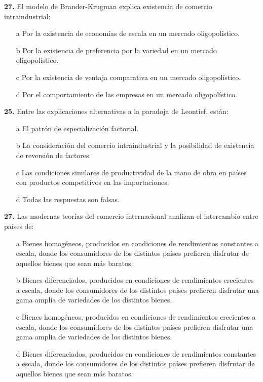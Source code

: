 \documentclass{nuevotema}
\begin{document}
\textbf{27.} El modelo de Brander-Krugman explica existencia de comercio intraindustrial:
\begin{itemize}
	\item[a] Por la existencia de economías de escala en un mercado oligopolístico.
	\item[b] Por la existencia de preferencia por la variedad en un mercado oligopolístico.
	\item[c] Por la existencia de ventaja comparativa en un mercado oligopolístico.
	\item[d] Por el comportamiento de las empresas en un mercado oligopolístico.
\end{itemize}

\textbf{25.} Entre las explicaciones alternativas a la paradoja de Leontief, están:
\begin{itemize}
	\item[a] El patrón de especialización factorial.
	\item[b] La consideración del comercio intraindustrial y la posibilidad de existencia de reversión de factores.
	\item[c] Las condiciones similares de productividad de la mano de obra en países con productos competitivos en las importaciones.
	\item[d] Todas las respuestas son falsas.
\end{itemize}

\textbf{27.} Las modernas teorías del comercio internacional analizan el intercambio entre países de:
\begin{itemize}
	\item[a] Bienes homogéneos, producidos en condiciones de rendimientos constantes a escala, donde los consumidores de los distintos países prefieren disfrutar de aquellos bienes que sean más baratos. 
	\item[b] Bienes diferenciados, producidos en condiciones de rendimientos crecientes a escala, donde los consumidores de los distintos países prefieren disfrutar una gama amplia de variedades de los distintos bienes.
	\item[c] Bienes homogéneos, producidos en condiciones de rendimientos crecientes a escala, donde los consumidores de los distintos países prefieren disfrutar una gama amplia de variedades de los distintos bienes.
	\item[d] Bienes diferenciados, producidos en condiciones de rendimientos constantes a escala, donde los consumidores de los distintos países prefieren disfrutar de aquellos bienes que sean más baratos.
\end{itemize}
\end{document}
